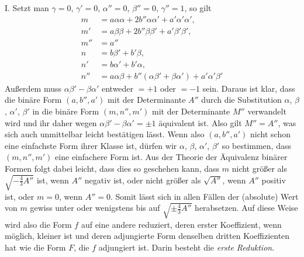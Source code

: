 I. Setzt man \(\gamma=0\), \(\gamma'=0\), \(\alpha''=0\), \(\beta''=0\), \(\gamma''=1\), so gilt
\[
\begin{aligned}
m&=a\alpha\alpha+2b''\alpha\alpha'+a'\alpha'\alpha',\\
m'&=a\beta\beta+2b''\beta\beta'+a'\beta'\beta',\\
m''&=a''\\
n&=b\beta'+b'\beta,\\
n'&=b\alpha'+b'\alpha,\\
n''&=a\alpha\beta+b''(\alpha\beta'+\beta\alpha')+a'\alpha'\beta'
\end{aligned}
\]
Außerdem muss \(\alpha\beta'-\beta\alpha'\) entweder \(=+1\) oder \(=-1\) sein. Daraus ist klar, dass die binäre Form \((a,b'',a')\) mit der Determinante \(A''\) durch die Substitution \(\alpha\), \(\beta\), \(\alpha'\), \(\beta'\) in die binäre Form \((m,n'',m')\) mit der Determinante \(M''\) verwandelt wird und ihr daher wegen \(\alpha\beta'-\beta\alpha'=\pm1\) äquivalent ist. Also gilt \(M''=A''\), was sich auch unmittelbar leicht bestätigen lässt. Wenn also \((a,b'',a')\) nicht schon eine einfachste Form ihrer Klasse ist, dürfen wir \(\alpha\), \(\beta\), \(\alpha'\), \(\beta'\) so bestimmen, dass \((m,n'',m')\) eine einfachere Form ist. Aus der Theorie der Äquivalenz binärer Formen folgt dabei leicht, dass dies so geschehen kann, dass \(m\) nicht größer als \(\sqrt{-\frac{4}{3}A''}\) ist, wenn \(A''\) negativ ist, oder nicht größer als \(\sqrt{A''}\), wenn \(A''\) positiv ist, oder \(m=0\), wenn \(A''=0\). Somit lässt sich in allen Fällen der (absolute) Wert von \(m\) gewiss unter oder wenigstens bis auf \(\sqrt{\pm\frac{4}{3}A''}\) herabsetzen. Auf diese Weise wird also die Form \(f\) auf eine andere reduziert, deren erster Koeffizient, wenn möglich, kleiner ist und deren adjungierte Form denselben dritten Koeffizienten hat wie die Form \(F\), die \(f\) adjungiert ist. Darin besteht die \emph{erste Reduktion}.

